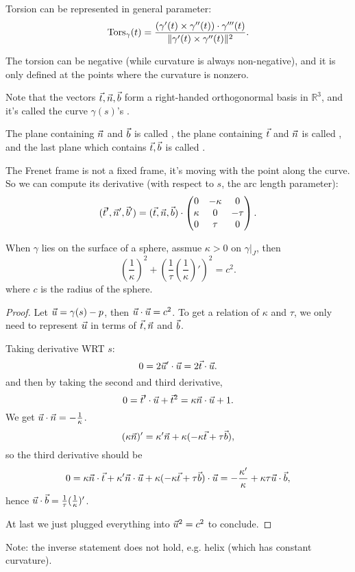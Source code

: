 \begin{proposition}
	Torsion can be represented in general parameter:
	\[
	\operatorname{Tors}_\gamma(t) = \frac{(\gamma'(t)\times \gamma''(t))\cdot \gamma'''(t)}
	{\lVert \gamma'(t)\times \gamma''(t) \rVert^2 }.
	\]
\end{proposition}
\begin{remark}
    The torsion can be negative (while curvature is always non-negative),
	and it is only defined at the points where the curvature is nonzero.
\end{remark}

Note that the vectors $\vec{t},\vec{n},\vec{b}$ form a right-handed
orthogonormal basis in $\mathbb{R}^3$, and it's called the curve
$\gamma(s)$'s .

The plane containing $\vec{n}$ and $\vec{b}$ is called ,
the plane containing $\vec{t}$ and $\vec{n}$ is called ,
and the last plane which contains $\vec{t},\vec{b}$ is called .

The Frenet frame is not a fixed frame, it's moving with the point along the curve.
So we can compute its derivative (with respect to $s$, the arc length parameter):
\[
	(\vec{t}',\vec{n}',\vec{b}') = (\vec{t}, \vec{n}, \vec{b})\cdot
	\begin{pmatrix}
		0&-\kappa&0\\ \kappa&0&-\tau\\0&\tau&0
	\end{pmatrix}.
\]
\begin{example}
    When $\gamma$ lies on the surface of a sphere, assmue
	$\kappa>0$ on  $\gamma\big|_J$, then
	\[
		\left(\frac{1}{\kappa}\right)^2 +
		\left(\frac{1}{\tau}\left(\frac{1}{\kappa}\right)'\right)^2 = c^2.
	\]
	where $c$ is the radius of the sphere.
	\begin{proof}[Proof]
		Let $\vec{u} = \gamma(s) - p$,
		then $\vec{u}\cdot\vec{u} = c^2$.
		To get a relation of $\kappa$ and  $\tau$, we only need to
		represent $\vec{u}$ in terms of $\vec{t},\vec{n}$ and $\vec{b}$.

		Taking derivative WRT $s$:
		\[
		0 = 2\vec{u}'\cdot\vec{u} = 2\vec{t}\cdot\vec{u}.
		\]
		and then by taking the second and third derivative,
		\[
		0 = \vec{t}'\cdot\vec{u} + \vec{t}^2 = \kappa\vec{n} \cdot \vec{u} + 1.
		\]
		We get $\vec{u}\cdot\vec{n}  = -\frac{1}{\kappa}$.
		\[
			(\kappa\vec{n})' = \kappa'\vec{n} + \kappa(-\kappa\vec{t} + \tau\vec{b}),
		\]
		so the third derivative should be
		\[
		0 = \kappa\vec{n}\cdot\vec{t} +
		\kappa'\vec{n}\cdot\vec{u} +
		\kappa(-\kappa\vec{t} + \tau\vec{b})\cdot\vec{u}
		= -\frac{\kappa'}{\kappa} + \kappa\tau\vec{u}\cdot\vec{b},
		\]
		hence $\vec{u}\cdot\vec{b} = \frac{1}{\tau}(\frac{1}{\kappa})'$.

		At last we just plugged everything into $\vec{u}^2 = c^2$ to conclude.
	\end{proof}

	Note: the inverse statement does not hold, e.g. helix
	(which has constant curvature).
\end{example}

